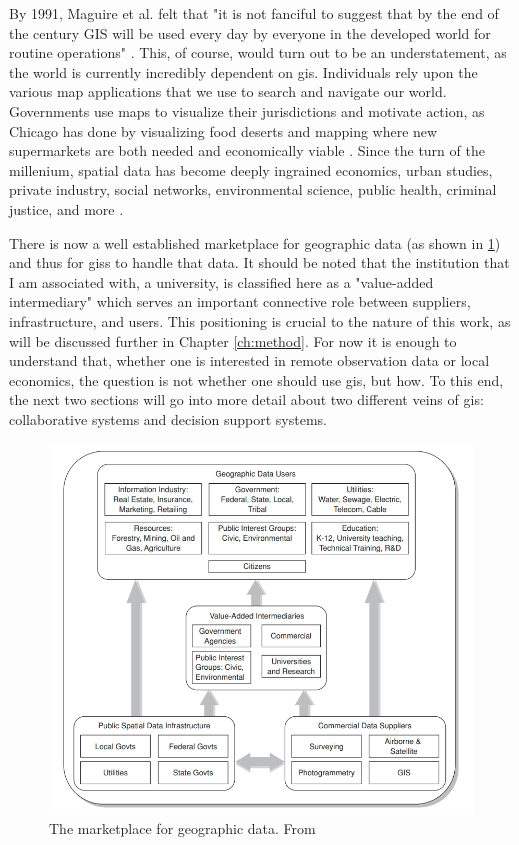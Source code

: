 By 1991, Maguire et al. felt that "it is not fanciful to suggest that by the end of the century GIS will be used every day by everyone in the developed world for routine operations" \cite{maguireGeographicalInformationSystems1991}. This, of course, would turn out to be an understatement, as the world is currently incredibly dependent on \ac{gis}. Individuals rely upon the various map applications that we use to search and navigate our world. Governments use maps to visualize their jurisdictions and motivate action, as Chicago has done by visualizing food deserts and mapping where new supermarkets are both needed and economically viable \cite{goldsmithResponsiveCityEngaging2014}. Since the turn of the millenium, spatial data has become deeply ingrained economics, urban studies, private industry, social networks, environmental science, public health, criminal justice, and more \cite{goodchildSpatiallyIntegratedSocial2000}.

There is now a well established marketplace for geographic data (as shown in \ref{fig:marketplace}) and thus for \acp{gis} to handle that data. It should be noted that the institution that I am associated with, a university, is classified here as a "value-added intermediary" which serves an important connective role between suppliers, infrastructure, and users. This positioning is crucial to the nature of this work, as will be discussed further in Chapter \ref{ch:method}. For now it is enough to understand that, whether one is interested in remote observation data or local economics, the question is not whether one should use \ac{gis}, but how. To this end, the next two sections will go into more detail about two different veins of \ac{gis}: collaborative systems and decision support systems.

\begin{figure}[h]
	\centering
	\includegraphics[scale=0.4]{Figures/chap2/GISMarketplace.png}
	\caption[The marketplace for geographic data]{The marketplace for geographic data. From \cite{cowenAvailabilityGeographicData2007}}
	\label{fig:marketplace}
\end{figure}

